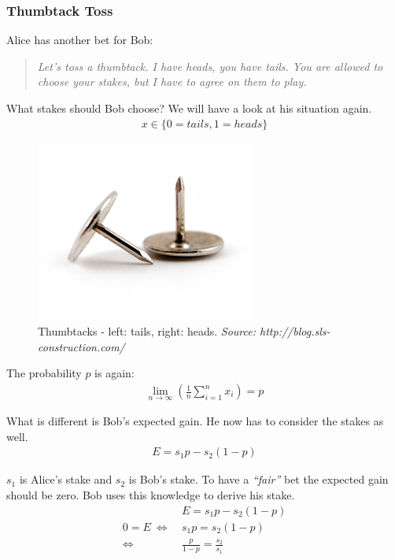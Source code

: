 \documentclass[../main/Notes.tex]{subfiles}
\begin{document}
\subsubsection*{Thumbtack Toss}
\label{example:Thumbtack Toss}
Alice has another bet for Bob:
\begin{quote}
\textit{Let's toss a thumbtack. I have heads, you have tails. You are allowed to choose your stakes, but I have to agree on them to play.}
\end{quote}
What stakes should Bob choose?
We will have a look at his situation again.
\begin{align*}
x \in \{0 = tails, 1 = heads\}
\end{align*}
\begin{figure}[ht]
  \centering
  \includegraphics[scale=0.5]{../images/thumbtacks}
  \caption{Thumbtacks - left: tails, right: heads. \textit{Source: http://blog.sls-construction.com/}}
\end{figure}

The probability $p$ is again:
\begin{align*}
\lim_{n\rightarrow\infty}\left(\frac{1}{n}\sum\limits_{i=1}^n x_i\right) = p
\end{align*}

What is different is Bob's expected gain. He now has to consider the stakes as well.
\begin{align*}
E = s_1 p - s_2 (1 - p)
\end{align*}

$s_1$ is Alice's stake and $s_2$ is Bob's stake. To have a \textit{``fair''} bet the expected gain should be zero. Bob uses this knowledge to derive his stake.
\begin{align*}
& \: E = s_1 p - s_2 (1 - p)\\
0 = E \: \Leftrightarrow & \: s_1 p = s_2 (1 - p)\\
\Leftrightarrow & \: \frac{p}{1-p} = \frac{s_2}{s_1}
\end{align*}
\end{document}
